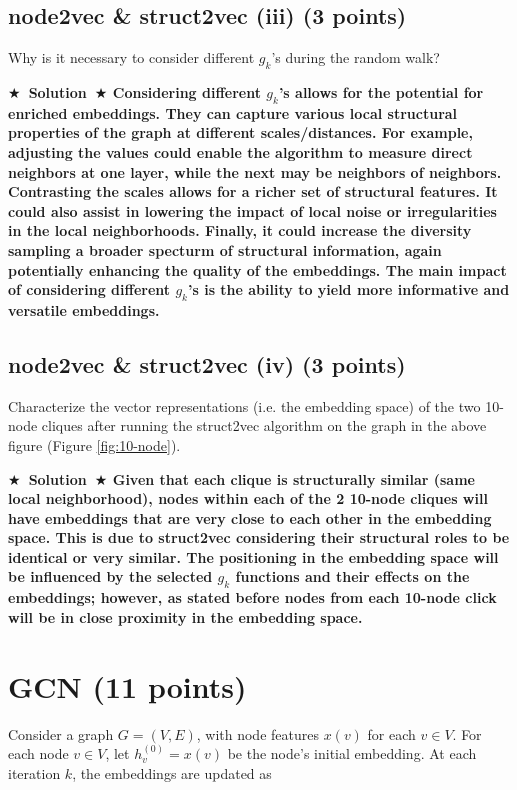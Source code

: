 \documentclass{article}
\numberwithin{figure}{section}
\newcommand{\Solution}[1]{{\medskip \color{red} \bf $\bigstar$~\sf \textbf{Solution}~$\bigstar$ \sf #1 } \bigskip}
\begin{document}
\subsection{node2vec \& struct2vec (iii) (3 points)}
Why is it necessary to consider different $g_k$'s during the random walk?

\Solution{
Considering different $g_k$'s allows for the potential for enriched embeddings. They can capture various local structural properties of the graph at different scales/distances. For example, adjusting the values could enable the algorithm to measure direct neighbors at one layer, while the next may be neighbors of neighbors. Contrasting the scales allows for a richer set of structural features. It could also assist in lowering the impact of local noise or irregularities in the local neighborhoods. Finally, it could increase the diversity sampling a broader specturm of structural information, again potentially enhancing the quality of the embeddings. The main impact of considering different $g_k$'s is the ability to yield more informative and versatile embeddings.
}

\subsection{node2vec \& struct2vec (iv) (3 points)}
Characterize the vector representations (i.e. the embedding space) of the two 10-node cliques after running the struct2vec algorithm on the graph in the above figure (Figure \ref{fig:10-node}).

\Solution{
Given that each clique is structurally similar (same local neighborhood), nodes within each of the 2 10-node cliques will have embeddings that are very close to each other in the embedding space. This is due to struct2vec considering their structural roles to be identical or very similar. The  positioning in the embedding space will be influenced by the selected $g_k$ functions and their effects on the embeddings; however, as stated before nodes from each 10-node click will be in close proximity in the embedding space.
}


\section{GCN (11 points)}

Consider a graph $G = (V, E)$, with node features $x(v)$ for each $v \in V$. For each node $v \in V$, let $h^{(0)}_v = x(v)$ be the node’s initial embedding. At each iteration $k$, the embeddings are updated as 
\end{document}
